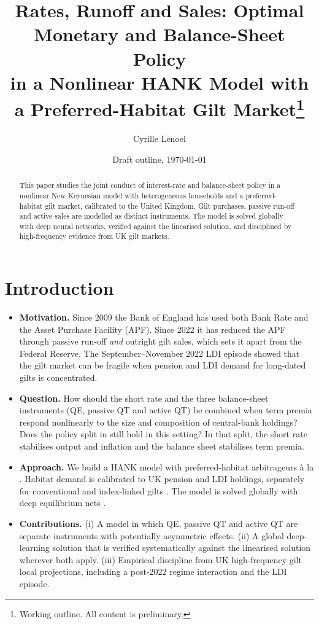 \documentclass[11pt,a4paper]{article}
\title{Rates, Runoff and Sales: Optimal Monetary and Balance-Sheet Policy\\ in a Nonlinear HANK Model with a Preferred-Habitat Gilt Market\thanks{Working outline. All content is preliminary.}}
\author{Cyrille Lenoel}
\date{Draft outline, \today}
\begin{document}
\maketitle

\begin{abstract}
\noindent [To be written.] This paper studies the joint conduct of interest-rate and balance-sheet policy in a nonlinear New Keynesian model with heterogeneous households and a preferred-habitat gilt market, calibrated to the United Kingdom. Gilt purchases, passive run-off and active sales are modelled as distinct instruments. The model is solved globally with deep neural networks, verified against the linearised solution, and disciplined by high-frequency evidence from UK gilt markets.
\end{abstract}

\section{Introduction}
\begin{itemize}
  \item \textbf{Motivation.} Since 2009 the Bank of England has used both Bank Rate and the Asset Purchase Facility (APF). Since 2022 it has reduced the APF through passive run-off \emph{and} outright gilt sales, which sets it apart from the Federal Reserve. The September--November 2022 LDI episode showed that the gilt market can be fragile when pension and LDI demand for long-dated gilts is concentrated.
  \item \textbf{Question.} How should the short rate and the three balance-sheet instruments (QE, passive QT and active QT) be combined when term premia respond nonlinearly to the size and composition of central-bank holdings? Does the policy split in \citet{KamdarRay2026} still hold in this setting? In that split, the short rate stabilises output and inflation and the balance sheet stabilises term premia.
  \item \textbf{Approach.} We build a HANK model with preferred-habitat arbitrageurs à la \citet{VayanosVila2021}. Habitat demand is calibrated to UK pension and LDI holdings, separately for conventional and index-linked gilts \citep{ChenBeetsmaVanWijnbergen}. The model is solved globally with deep equilibrium nets \citep{AzinovicGaegaufScheidegger2022, MaliarMaliarWinant2021}.
  \item \textbf{Contributions.} (i) A model in which QE, passive QT and active QT are separate instruments with potentially asymmetric effects. (ii) A global deep-learning solution that is verified systematically against the linearised solution wherever both apply. (iii) Empirical discipline from UK high-frequency gilt local projections, including a post-2022 regime interaction and the LDI episode.
\end{itemize}
\end{document}
